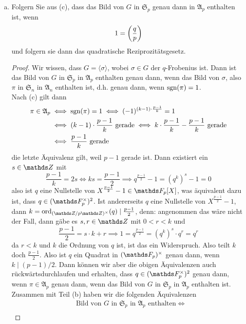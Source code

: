 \begin{enumerate}[(a)]
\begin{proof}
    \end{proof}
    \item Folgern Sie aus (c), dass das Bild von $G$ in $\mathfrak{S}_p$ genau dann in $\mathfrak{A}_p$ enthalten ist, wenn 
    \[
        1 = \left(\frac{q}{p}\right)
    \] und folgern sie dann das quadratische Reziprozitätsgesetz.
    \begin{proof}
        Wir wissen, dass $G=\langle \sigma\rangle$, wobei $\sigma\in G$ der $q$-Frobenius ist. Dann ist das Bild von $G$ in $\mathfrak{S}_p$ in $\mathfrak{A}_p$ enthalten genau dann, wenn das Bild von $\sigma$, also $\pi$ in $\mathfrak{S}_n$ in $\mathfrak{A}_n$ enthalten ist, d.h. genau dann, wenn $\operatorname{sgn}(\pi)=1$. \\
        Nach (c) gilt dann 
        \begin{align*}
            \pi \in \mathfrak{A}_p &\iff \sgn(\pi) = 1 \iff (-1)^{(k-1)\cdot \frac{p-1}{k}} = 1 \\ &\iff (k-1)\cdot \frac{p-1}{k} \ \text{gerade} \iff k\cdot \frac{p-1}{k}-\frac{p-1}{k} \ \text{gerade}
            \\ &\iff \frac{p-1}{k} \ \text{gerade}
        \end{align*}
        die letzte Äquivalenz gilt, weil $p-1$ gerade ist. Dann existiert ein $s\in \Z$ mit 
        \[
        \frac{p-1}{k} = 2s \iff ks = \frac{p-1}{2} \implies q^\frac{p-1}{2} -1 = (q^k)^s - 1 = 0     
        \]
        also ist $q$ eine Nullstelle von $X^\frac{p-1}{2}-1\in \F_p[X]$, was äquivalent dazu ist, dass $q\in (\F_p^\times)^2$. Ist andererseits $q$ eine Nullstelle von $X^\frac{p-1}{2}-1$, dann $k=\ord_{(\Z/p\Z)^\times}(q)\mid \frac{p-1}{2}$, denn: angenommen das wäre nicht der Fall, dann gäbe es $s,r\in \Z$ mit $0<r<k$ und 
        \[
        \frac{p-1}{2} = s\cdot k + r \implies 1 = q^\frac{p-1}{2} = (q^k)^s\cdot q^r = q^r    
        \]
        da $r<k$ und $k$ die Ordnung von $q$ ist, ist das ein Widerspruch. Also teilt $k$ doch $\frac{p-1}{2}$. Also ist $q$ ein Quadrat in $(\F_p)^\times$ genau dann, wenn $k\mid (p-1)/2$. Dann können wir aber die obigen Äquivalenzen auch rückwärtsdurchlaufen und erhalten, dass $q\in (\F_p^\times)^2$ genau dann, wenn $\pi \in \mathfrak{A}_p$ genau dann, wenn das Bild von $G$ in $\mathfrak{S}_p$ in $\mathfrak{A}_p$ enthalten ist. \\
        Zusammen mit Teil (b) haben wir die folgenden Äquivalenzen
        \begin{align*}
            &\text{Bild von }G\text{ in } \mathfrak{S}_p \text{ in }\mathfrak{A}_p \text{ enthalten} \iff \\      

\end{align*}
\end{proof}
\end{enumerate}
